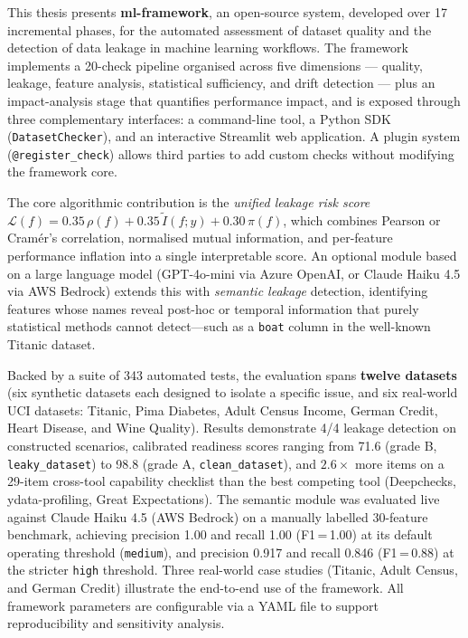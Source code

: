 \documentclass[12pt,a4paper]{report}
\begin{document}
This thesis presents \textbf{ml-framework}, an open-source system, developed over 17
incremental phases, for the automated assessment of dataset quality and the detection of data
leakage in machine learning workflows. The framework implements a 20-check pipeline organised
across five dimensions --- quality, leakage, feature analysis, statistical sufficiency, and drift
detection --- plus an impact-analysis stage that quantifies performance impact, and is exposed
through three complementary interfaces: a
command-line tool, a Python SDK (\texttt{DatasetChecker}), and an interactive Streamlit web
application. A plugin system (\texttt{@register\_check}) allows third parties to add custom
checks without modifying the framework core.

The core algorithmic contribution is the \emph{unified leakage risk score}
$\mathcal{L}(f) = 0.35\,\rho(f) + 0.35\,\tilde{I}(f;y) + 0.30\,\pi(f)$, which combines
Pearson or Cram\'er's correlation, normalised mutual information, and per-feature
performance inflation into a single interpretable score. An optional module based on a
large language model (GPT-4o-mini via Azure OpenAI, or Claude Haiku 4.5 via AWS Bedrock)
extends this with \emph{semantic leakage} detection,
identifying features whose names reveal post-hoc or temporal information that purely
statistical methods cannot detect---such as a \texttt{boat} column in the well-known Titanic
dataset.

Backed by a suite of 343 automated tests, the evaluation spans \textbf{twelve datasets}
(six synthetic datasets each designed to isolate a specific issue, and six real-world UCI
datasets: Titanic, Pima Diabetes, Adult Census Income, German Credit, Heart Disease, and Wine
Quality). Results demonstrate 4/4 leakage detection on constructed scenarios, calibrated
readiness scores ranging from 71.6 (grade B, \texttt{leaky\_dataset}) to 98.8 (grade A,
\texttt{clean\_dataset}), and $2.6\times$ more items on a 29-item cross-tool capability
checklist than the best competing tool (Deepchecks, ydata-profiling, Great Expectations).
The semantic module was evaluated live against Claude Haiku 4.5 (AWS Bedrock) on a
manually labelled 30-feature benchmark, achieving precision 1.00 and recall 1.00
(F1\,=\,1.00) at its default operating threshold (\texttt{medium}), and precision 0.917
and recall 0.846 (F1\,=\,0.88) at the stricter \texttt{high} threshold. Three real-world
case studies (Titanic, Adult
Census, and German Credit) illustrate the end-to-end use of the framework. All framework
parameters are configurable via a YAML file to support reproducibility and sensitivity analysis.
\end{document}
